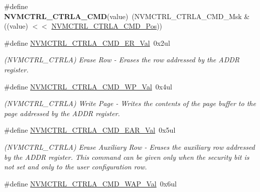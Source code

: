 \begin{DoxyCompactItemize}
\item 
\hypertarget{group___s_a_m_l21___n_v_m_c_t_r_l_ga1dd6561aa8e0944fda54ac91591a7672}{}\#define {\bfseries N\+V\+M\+C\+T\+R\+L\+\_\+\+C\+T\+R\+L\+A\+\_\+\+C\+M\+D}(value)~(N\+V\+M\+C\+T\+R\+L\+\_\+\+C\+T\+R\+L\+A\+\_\+\+C\+M\+D\+\_\+\+Msk \& ((value) $<$$<$ \hyperlink{group___s_a_m_l21___n_v_m_c_t_r_l_ga5346c6f8ba695f7cadb7f07bde6e25f8}{N\+V\+M\+C\+T\+R\+L\+\_\+\+C\+T\+R\+L\+A\+\_\+\+C\+M\+D\+\_\+\+Pos}))\label{group___s_a_m_l21___n_v_m_c_t_r_l_ga1dd6561aa8e0944fda54ac91591a7672}

\item 
\hypertarget{group___s_a_m_l21___n_v_m_c_t_r_l_ga6c7936d9e4cd317170b54ffb5b3b428d}{}\#define \hyperlink{group___s_a_m_l21___n_v_m_c_t_r_l_ga6c7936d9e4cd317170b54ffb5b3b428d}{N\+V\+M\+C\+T\+R\+L\+\_\+\+C\+T\+R\+L\+A\+\_\+\+C\+M\+D\+\_\+\+E\+R\+\_\+\+Val}~0x2ul\label{group___s_a_m_l21___n_v_m_c_t_r_l_ga6c7936d9e4cd317170b54ffb5b3b428d}

\begin{DoxyCompactList}\small\item\em (N\+V\+M\+C\+T\+R\+L\+\_\+\+C\+T\+R\+L\+A) Erase Row -\/ Erases the row addressed by the A\+D\+D\+R register. \end{DoxyCompactList}\item 
\hypertarget{group___s_a_m_l21___n_v_m_c_t_r_l_gad7cfc5fc0cd04b2bbe3337a035b6d127}{}\#define \hyperlink{group___s_a_m_l21___n_v_m_c_t_r_l_gad7cfc5fc0cd04b2bbe3337a035b6d127}{N\+V\+M\+C\+T\+R\+L\+\_\+\+C\+T\+R\+L\+A\+\_\+\+C\+M\+D\+\_\+\+W\+P\+\_\+\+Val}~0x4ul\label{group___s_a_m_l21___n_v_m_c_t_r_l_gad7cfc5fc0cd04b2bbe3337a035b6d127}

\begin{DoxyCompactList}\small\item\em (N\+V\+M\+C\+T\+R\+L\+\_\+\+C\+T\+R\+L\+A) Write Page -\/ Writes the contents of the page buffer to the page addressed by the A\+D\+D\+R register. \end{DoxyCompactList}\item 
\hypertarget{group___s_a_m_l21___n_v_m_c_t_r_l_ga07c4451d3f3e0d0dbed551ef0c3bbd21}{}\#define \hyperlink{group___s_a_m_l21___n_v_m_c_t_r_l_ga07c4451d3f3e0d0dbed551ef0c3bbd21}{N\+V\+M\+C\+T\+R\+L\+\_\+\+C\+T\+R\+L\+A\+\_\+\+C\+M\+D\+\_\+\+E\+A\+R\+\_\+\+Val}~0x5ul\label{group___s_a_m_l21___n_v_m_c_t_r_l_ga07c4451d3f3e0d0dbed551ef0c3bbd21}

\begin{DoxyCompactList}\small\item\em (N\+V\+M\+C\+T\+R\+L\+\_\+\+C\+T\+R\+L\+A) Erase Auxiliary Row -\/ Erases the auxiliary row addressed by the A\+D\+D\+R register. This command can be given only when the security bit is not set and only to the user configuration row. \end{DoxyCompactList}\item 
\hypertarget{group___s_a_m_l21___n_v_m_c_t_r_l_ga16088beab7d82fdbb34bac9971d21859}{}\#define \hyperlink{group___s_a_m_l21___n_v_m_c_t_r_l_ga16088beab7d82fdbb34bac9971d21859}{N\+V\+M\+C\+T\+R\+L\+\_\+\+C\+T\+R\+L\+A\+\_\+\+C\+M\+D\+\_\+\+W\+A\+P\+\_\+\+Val}~0x6ul\label{group___s_a_m_l21___n_v_m_c_t_r_l_ga16088beab7d82fdbb34bac9971d21859}


\end{DoxyCompactItemize}
